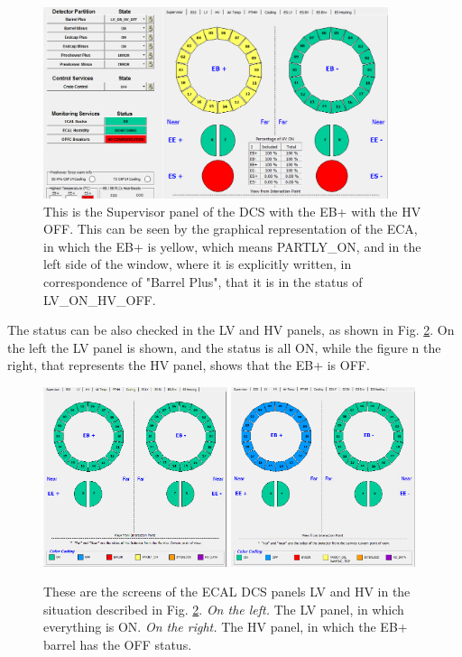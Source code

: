 \documentclass[12pt]{article}
\begin{document}
\begin{figure}[!h]
	\centering
	\includegraphics[width=0.9\textwidth]{Pics/Mainpanel_HVOFF.png}
	\caption{This is the Supervisor panel of the DCS with the EB+ with the HV OFF. This can be seen by the graphical representation of the ECA, in which the EB+ is yellow, which means PARTLY\_ON, and in the left side of the window, where it is explicitly written, in correspondence of "Barrel Plus", that it is in the status of LV\_ON\_HV\_OFF.}
	\label{HVOFF_main}
\end{figure}

The status can be also checked in the LV and HV panels, as shown in Fig. \ref{fig:HVOFF_LVHV}. On the left the LV panel is shown, and the status is all ON, while the figure n the right, that represents the HV panel, shows that the EB+ is OFF.

\begin{figure}[!h]
	\centering
	\includegraphics[width=0.48\textwidth]{Pics/LV_panel.png}
	\quad 
	\includegraphics[width=0.48\textwidth]{Pics/HV_OFF.png}
	\caption{These are the screens of the ECAL DCS panels LV and HV in the situation described in Fig. \ref{fig:HVOFF_LVHV}. \textit{On the left.} The LV panel, in which everything is ON. \textit{On the right.} The HV panel, in which the EB+ barrel has the OFF status. }
	\label{fig:HVOFF_LVHV}
	

\end{figure}
\end{document}
